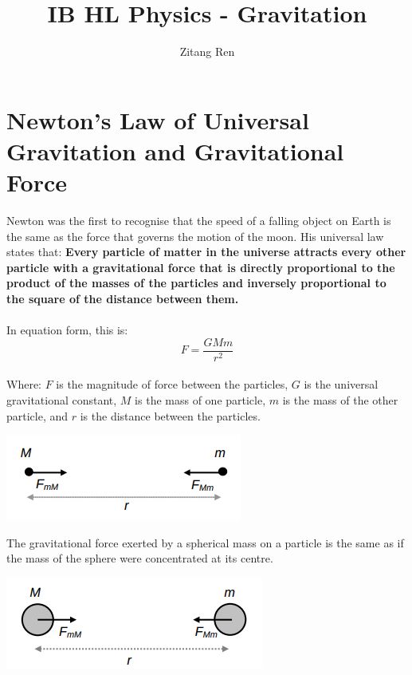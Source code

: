 \documentclass{article}
\title{IB HL Physics - Gravitation}
\author{Zitang Ren}
\begin{document}
\maketitle

\section{Newton's Law of Universal Gravitation and Gravitational Force}
Newton was the first to recognise that the speed of a falling object on Earth is the same as the force that governs the motion of the moon.
His universal law states that: \textbf{Every particle of matter in the universe attracts every other particle with a gravitational force that is directly proportional to the product of the masses of the particles and inversely proportional to the square of the distance between them.}
\\
\\In equation form, this is:
\begin{equation}
    F=\frac{GMm}{r^2}
\end{equation}
\\Where: $F$ is the magnitude of force between the particles, $G$ is the universal gravitational constant, $M$ is the mass of one particle, $m$ is the mass of the other particle, and $r$ is the distance between the particles.
\begin{center}
    \includegraphics[scale=0.6]{assets/arrowForce.png}
\end{center}\leavevmode
The gravitational force exerted by a spherical mass on a particle is the same as if the mass of the sphere were concentrated at its centre.
\begin{center}
    \includegraphics[scale=0.6]{assets/sphereForce.png}
\end{center}\leavevmode

\pagebreak
\end{document}

